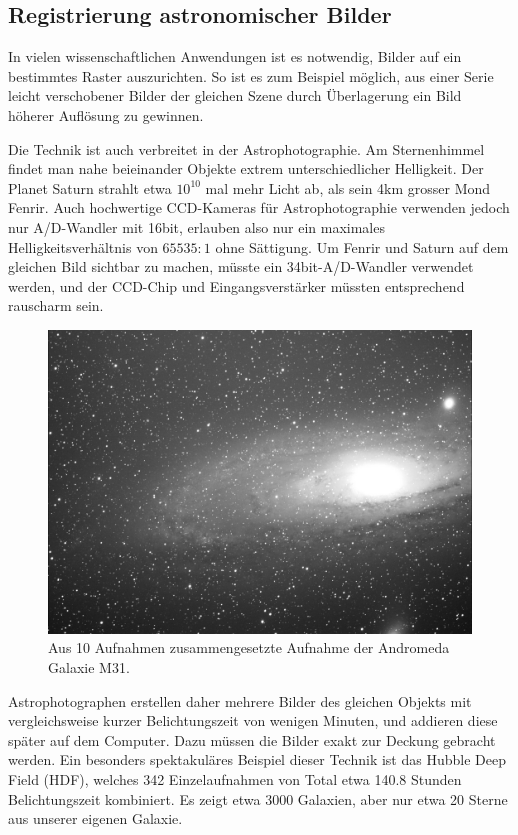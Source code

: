%
%
%
\subsection{Registrierung astronomischer Bilder}
In vielen wissenschaftlichen Anwendungen ist es notwendig, Bilder auf
ein bestimmtes Raster auszurichten. So ist es zum Beispiel möglich,
aus einer Serie leicht verschobener Bilder der gleichen Szene durch
Überlagerung ein Bild höherer Auflösung zu gewinnen.

Die Technik ist auch verbreitet in der Astrophotographie. Am Sternenhimmel
findet man nahe beieinander Objekte extrem unterschiedlicher Helligkeit.
Der Planet Saturn strahlt etwa $10^{10}$ mal mehr Licht ab, als sein
4km grosser Mond Fenrir.
Auch hochwertige CCD-Kameras für Astrophotographie verwenden jedoch nur
A/D-Wandler mit 16bit, erlauben also nur ein maximales
Helligkeitsverhältnis von $65535 : 1$ ohne Sättigung.
Um Fenrir und Saturn auf dem gleichen Bild sichtbar zu machen, müsste
ein 34bit-A/D-Wandler verwendet werden, und der CCD-Chip und
Eingangsverstärker müssten entsprechend rauscharm sein.

\begin{figure}
\begin{center}
\includegraphics[width=\hsize]{graphics/andromeda-gimped.jpg}
\end{center}
\caption{Aus 10 Aufnahmen zusammengesetzte Aufnahme der Andromeda Galaxie
M31.\label{andromeda-image}}
\end{figure}

Astrophotographen erstellen daher mehrere Bilder des gleichen Objekts
mit vergleichsweise kurzer Belichtungszeit von wenigen Minuten, und
addieren diese später auf dem Computer. Dazu müssen die Bilder
exakt zur Deckung gebracht werden.
Ein besonders spektakuläres Beispiel dieser Technik ist das Hubble
Deep Field (HDF), welches 342 Einzelaufnahmen von Total
etwa 140.8 Stunden Belichtungszeit kombiniert.
Es zeigt etwa 3000 Galaxien, aber nur etwa 20 Sterne aus unserer eigenen
Galaxie. 

